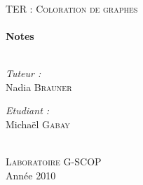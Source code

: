 \begin{titlepage}
\begin{center}

\quad \\[2cm]
 
\textsc{\Large TER : Coloration de graphes}\\[0.5cm]

\HRule \\[0.5cm]
{ \huge \bfseries Notes}\\[0.4cm]  %
 
\HRule \\[1.5cm]

\begin{minipage}{0.4\textwidth}
\begin{flushleft} \large
\emph{Tuteur :}\\
Nadia \textsc{Brauner}
\end{flushleft}
\end{minipage}
\begin{minipage}{0.4\textwidth}
\begin{flushright} \large
\emph{Etudiant :} \\

Michaël \textsc{Gabay}\\
\end{flushright}
\end{minipage}


\quad \\[2cm]


\textsc{\LARGE Laboratoire G-SCOP}\\[1.5cm]

\vfill 
{\large Année 2010}

\end{center} 
\end{titlepage}
